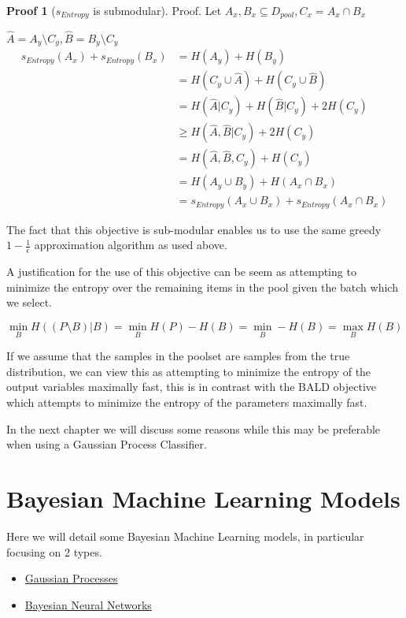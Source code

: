 \documentclass[12pt, a4paper]{report}
\theoremstyle{definition}
\theoremstyle{definition}
\theoremstyle{definition}
\newtheorem{nproof}{Proof}[section]
\begin{document}
\begin{nproof}[$s_{Entropy}$ is submodular]
    Proof.
    Let $A_x,B_x \subseteq D_{pool}, C_x = A_x \cap B_x$
    
    $\hat{A} = A_y \setminus C_y, \hat{B} = B_y \setminus C_y$
    \begin{align*}
        s_{Entropy} (A_x) + s_{Entropy} (B_x) &= H(A_y) + H(B_y)\\
        &= H(C_y \cup \hat{A}) + H(C_y \cup \hat{B})\\
        &= H(\hat{A} | C_y) + H(\hat{B} | C_y) + 2 H(C_y)\\
        &\geq H(\hat{A}, \hat{B} | C_y) + 2 H(C_y)\\
        &= H(\hat{A}, \hat{B}, C_y) + H(C_y)\\
        &= H(A_y \cup B_y) + H(A_x \cap B_x)\\
        &= s_{Entropy} (A_x \cup B_x) + s_{Entropy} (A_x \cap B_x)
    \end{align*}

\end{nproof}

The fact that this objective is sub-modular enables us to use the same greedy $1 - \frac{1}{\epsilon}$ approximation algorithm as used above.

A justification for the use of this objective can be seem as attempting to minimize the entropy over the remaining items in the pool given the batch which we select.


$$\min_{B} H( \left(P \setminus B\right) | B) = \min_{B} H(P) - H(B) = \min_{B} - H(B) = \max_B H(B)$$

If we assume that the samples in the poolset are samples from the true distribution, we can view this as attempting to minimize the entropy of the output variables maximally fast, this is in contrast with the BALD objective which attempts to minimize the entropy of the parameters maximally fast.

In the next chapter we will discuss some reasons while this may be preferable when using a Gaussian Process Classifier.

\chapter{Bayesian Machine Learning Models}
\label{sec:Models}


Here we will detail some Bayesian Machine Learning models, in particular focusing on 2 types.

\begin{itemize}
    \item \hyperref[sec:GaussianProcesses]{Gaussian Processes}
    \item \hyperref[sec:BNNs]{Bayesian Neural Networks}
\end{itemize}
\end{document}

